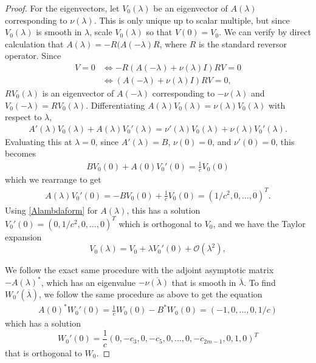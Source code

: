 \documentclass[thesis.tex]{subfiles}
\begin{document}
\begin{lemma}
\begin{proof}
For the eigenvectors, let $V_0(\lambda)$ be an eigenvector of $A(\lambda)$ corresponding to $\nu(\lambda)$. This is only unique up to scalar multiple, but since $V_0(\lambda)$ is smooth in $\lambda$, scale $V_0(\lambda)$ so that $V(0) = V_0$. We can verify by direct calculation that $A(\lambda) = -R(A(-\lambda)R$, where $R$ is the standard reversor operator. Since
\begin{align*}
[A(\lambda) - \nu(\lambda) I]V = 0 &\iff -R(A(-\lambda) + \nu(\lambda) I)RV = 0 \\
&\iff (A(-\lambda) + \nu(\lambda) I)RV = 0,
\end{align*}
$RV_0(\lambda)$ is an eigenvector of $A(-\lambda)$ corresponding to $-\nu(\lambda)$ and $V_0(-\lambda) = R V_0(\lambda)$. Differentiating $A(\lambda)V_0(\lambda) = \nu(\lambda) V_0(\lambda)$ with respect to $\lambda$,
\begin{align*}
A'(\lambda)V_0(\lambda) + A(\lambda)V_0'(\lambda) = \nu'(\lambda)V_0(\lambda) + \nu(\lambda)V_0'(\lambda).
\end{align*}
Evaluating this at $\lambda = 0$, since $A'(\lambda) = B$, $\nu(0) = 0$, and $\nu'(0) = 0$, this becomes
\begin{align*}
B V_0(0) + A(0)V_0'(0) = \frac{1}{c} V_0(0)
\end{align*}
which we rearrange to get
\begin{align*}
A(\lambda)V_0'(0) = -B V_0(0) + \frac{1}{c} V_0(0)
= (1/c^2, 0, \dots, 0)^T.
\end{align*}
Using \eqref{Alambdaform} for $A(\lambda)$, this has a solution $V_0'(0) = (0, 1/c^2, 0, \dots, 0)^T$ which is orthogonal to $V_0$, and we have the Taylor expansion
\[
V_0(\lambda) = V_0 + \lambda V_0'(0) + \mathcal{O}(\lambda^2),
\]

We follow the exact same procedure with the adjoint asymptotic matrix $-A(\lambda)^*$, which has an eigenvalue $-\overline{\nu(\lambda)}$ that is smooth in $\overline{\lambda}$. To find $W_0'(\overline{\lambda})$, we follow the same procedure as above to get the equation
\begin{align*}
A(0)^* W_0'(0) = \frac{1}{c} W_0(0) - B^* W_0(0)
= (-1, 0, \dots, 0, 1/c)
\end{align*}
which has a solution 
\[
W_0'(0) = \frac{1}{c} \left( 0, -c_3, 0, -c_5, 0, \dots, 0, -c_{2m-1}, 0, 1, 0\right)^T
\]
that is orthogonal to $W_0$.


\end{proof}
\end{lemma}
\end{document}
